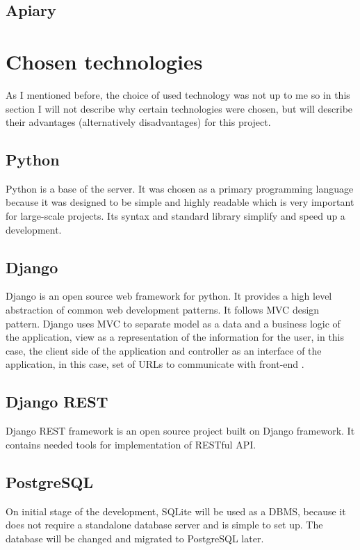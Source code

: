 \subsection{Apiary}




\section{Chosen technologies}
As I mentioned before, the choice of used technology was not up to me so in this section I will not describe why
certain technologies were chosen, but will describe their advantages (alternatively disadvantages) for this project.


\subsection{Python}
Python is a base of the server. It was chosen as a primary programming language because it was designed to be simple
and highly readable which is very important for large-scale projects. Its syntax and standard library simplify and
speed up a development.

\subsection{Django}
Django is an open source web framework for python. It provides a high level abstraction of common web development
patterns. It follows \ac{MVC} design pattern. Django uses \ac{MVC} to separate model as a data and a business logic of
the application, view as a representation of the information for the user, in this case, the client side of the
application and controller as an interface of the application, in this case, set of URLs to communicate with
front-end \cite{django}.

\subsection{Django REST}
Django REST framework is an open source project built on Django framework. It contains needed tools for implementation
of \ac{REST}ful \ac{API}.

\subsection{PostgreSQL}
On initial stage of the development, SQLite will be used as a \ac{DBMS}, because it does not require a standalone
database server and is simple to set up. The database will be changed and migrated to PostgreSQL later.

